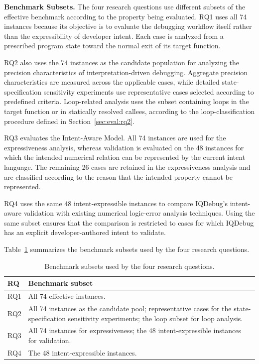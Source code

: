\documentclass[11pt,oneside]{report}
\theoremstyle{plain}
\theoremstyle{definition}
\theoremstyle{remark}
\begin{document}
\smallskip
\noindent\textbf{Benchmark Subsets.}
The four research questions use different subsets of the effective benchmark according to the property being evaluated.
RQ1 uses all 74 instances because its objective is to evaluate the debugging workflow itself rather than the expressibility of developer intent.
Each case is analyzed from a prescribed program state toward the normal exit of its target function.

RQ2 also uses the 74 instances as the candidate population for analyzing the precision characteristics of interpretation-driven debugging.
Aggregate precision characteristics are measured across the applicable cases, while detailed state-specification sensitivity experiments use representative cases selected according to predefined criteria.
Loop-related analysis uses the subset containing loops in the target function or in statically resolved callees, according to the loop-classification procedure defined in Section~\ref{sec:eval:rq2}.

RQ3 evaluates the Intent-Aware Model.
All 74 instances are used for the expressiveness analysis, whereas validation is evaluated on the 48 instances for which the intended numerical relation can be represented by the current intent language.
The remaining 26 cases are retained in the expressiveness analysis and are classified according to the reason that the intended property cannot be represented.

RQ4 uses the same 48 intent-expressible instances to compare IQDebug's intent-aware validation with existing numerical logic-error analysis techniques.
Using the same subset ensures that the comparison is restricted to cases for which IQDebug has an explicit developer-authored intent to validate.

Table~\ref{tab:eval:rq-datasets} summarizes the benchmark subsets used by the four research questions.

\begin{table}[t]
\centering
\caption{Benchmark subsets used by the four research questions.}
\label{tab:eval:rq-datasets}
\footnotesize
\begin{tabular}{@{}p{}p{}@{}}
\toprule
RQ & Benchmark subset \\
\midrule
RQ1 & All 74 effective instances. \\
RQ2 & All 74 instances as the candidate pool; representative cases for the state-specification sensitivity experiments; the loop subset for loop analysis. \\
RQ3 & All 74 instances for expressiveness; the 48 intent-expressible instances for validation. \\
RQ4 & The 48 intent-expressible instances. \\
\bottomrule
\end{tabular}
\end{table}
\end{document}
